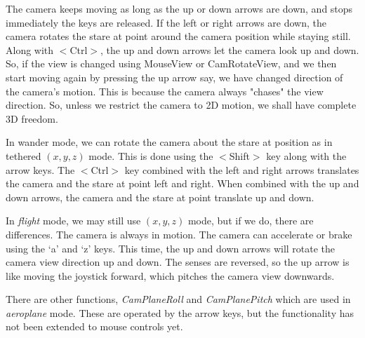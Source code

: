 \documentclass[12pt]{article}
\begin{document}
The camera keeps moving as long as the up or down arrows are
down, and stops immediately the keys are released.
If the left or right arrows are down, the camera rotates the stare
at point around the camera position  while staying still. Along with $<$Ctrl$>$, the up
and down arrows let the camera look up and down. So,
if the view is changed using MouseView or CamRotateView, and we then
start moving again by pressing the up arrow say, we have changed direction
of the camera's motion. This is because
the camera always "chases" the view direction. So, unless we restrict the camera
to 2D motion, we shall have complete 3D freedom.

In wander mode, we can rotate the camera about the stare at position
as in tethered $(x,y,z)$ mode. This is done using the $<$Shift$>$ key
along with the arrow keys. The $<$Ctrl$>$ key combined with the left
and right arrows translates the camera and the stare at point  left and right.
When combined with the up and down arrows, the camera and the stare at point 
translate up and down.

In {\it flight} mode, we may still use $(x,y,z)$ mode, but if we do,
there are differences. The camera is always in motion. The camera
can accelerate or brake using the `a' and `z' keys. This time,
the up and down arrows will rotate the camera view direction up
and down. The senses are reversed, so the up arrow is like moving the
joystick forward, which pitches the camera view downwards.

There are other functions, {\it CamPlaneRoll} and {\it CamPlanePitch}
which are used in  {\it aeroplane} mode. These are operated by the arrow
keys, but the functionality has not been extended to mouse controls yet.
\end{document}
